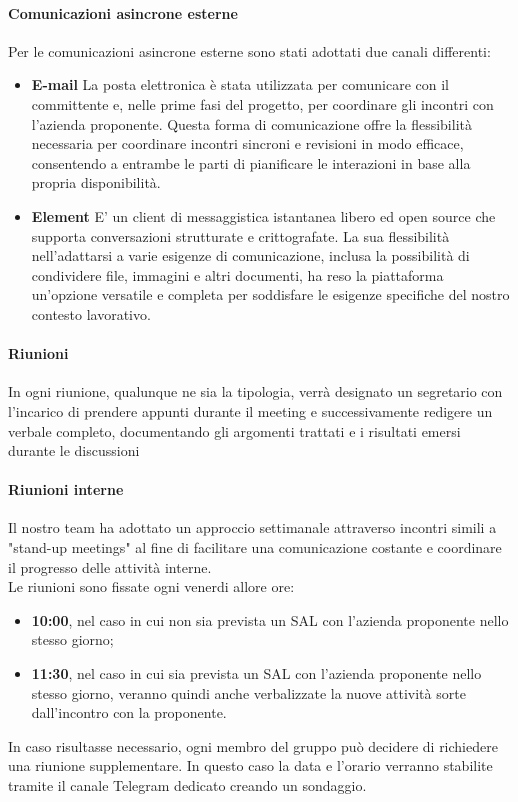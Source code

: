 \documentclass{article}
\begin{document}
\paragraph*{Comunicazioni asincrone esterne}
Per le comunicazioni asincrone esterne sono stati adottati due canali differenti:
\begin{itemize}
    \item \textbf{E-mail} La posta elettronica è stata utilizzata per comunicare con il committente e, nelle prime fasi del progetto, per coordinare gli incontri con l'azienda proponente. Questa forma di comunicazione offre la flessibilità necessaria per coordinare incontri sincroni e revisioni in modo efficace, consentendo a entrambe le parti di pianificare le interazioni in base alla propria disponibilità.
    \item \textbf{Element} E' un client di messaggistica istantanea libero ed open source che supporta conversazioni strutturate e crittografate. La sua flessibilità nell'adattarsi a varie esigenze di comunicazione, inclusa la possibilità di condividere file, immagini e altri documenti, ha reso la piattaforma un'opzione versatile e completa per soddisfare le esigenze specifiche del nostro contesto lavorativo.
\end{itemize}

\paragraph*{Riunioni}
In ogni riunione, qualunque ne sia la tipologia, verrà designato un segretario con l'incarico di prendere appunti durante il meeting e successivamente redigere un verbale completo, documentando gli argomenti trattati e i risultati emersi durante le discussioni

\paragraph{Riunioni interne}
Il nostro team ha adottato un approccio settimanale attraverso incontri simili a "stand-up meetings" al fine di facilitare una comunicazione costante e coordinare il progresso delle attività interne.\\

Le riunioni sono fissate ogni venerdi allore ore:
\begin{itemize}
    \item \textbf{10:00}, nel caso in cui non sia prevista un SAL con l'azienda proponente nello stesso giorno;
    \item \textbf{11:30}, nel caso in cui sia prevista un SAL con l'azienda proponente nello stesso giorno, veranno quindi anche verbalizzate la nuove attività sorte dall'incontro con la proponente.
\end{itemize} 
In caso risultasse necessario, ogni membro del gruppo può decidere di richiedere una riunione supplementare. In questo caso la data e l'orario verranno stabilite
tramite il canale Telegram dedicato creando un sondaggio.
\end{document}
